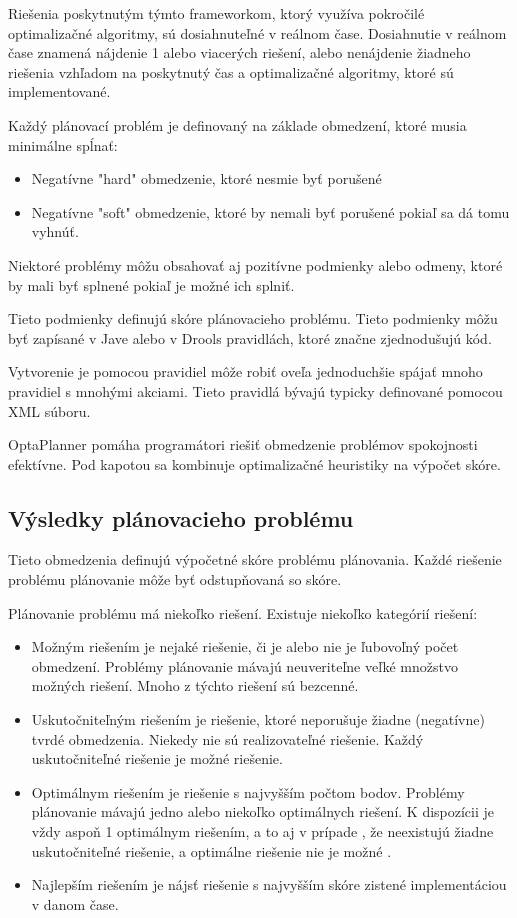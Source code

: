 Riešenia poskytnutým týmto frameworkom, ktorý využíva pokročilé optimalizačné algoritmy, sú dosiahnuteľné v reálnom čase. Dosiahnutie v reálnom čase znamená nájdenie 1 alebo viacerých riešení, alebo nenájdenie žiadneho riešenia vzhľadom na poskytnutý čas a optimalizačné algoritmy, ktoré sú implementované.

Každý plánovací problém je definovaný na základe obmedzení, ktoré musia minimálne spĺnať: \cite{optabook}
\begin{itemize}
\item Negatívne "hard" obmedzenie, ktoré nesmie byť porušené
\item Negatívne "soft" obmedzenie, ktoré by nemali byť porušené pokiaľ sa dá tomu vyhnúť.
\end{itemize}

Niektoré problémy môžu obsahovať aj pozitívne podmienky alebo odmeny, ktoré by mali byť splnené pokiaľ je možné ich splniť.

Tieto podmienky definujú skóre plánovacieho problému. Tieto podmienky môžu byť zapísané v Jave alebo v Drools pravidlách, ktoré značne zjednodušujú kód.

 Vytvorenie je pomocou pravidiel  môže robiť  oveľa jednoduchšie spájať mnoho pravidiel s mnohými akciami. Tieto pravidlá bývajú typicky definované pomocou XML súboru.

OptaPlanner pomáha  programátori riešiť obmedzenie problémov spokojnosti efektívne. Pod kapotou sa kombinuje optimalizačné heuristiky na výpočet skóre.



\subsection{Výsledky plánovacieho problému}

Tieto obmedzenia definujú výpočetné skóre problému plánovania. Každé riešenie problému plánovanie môže byť odstupňovaná so skóre. 

Plánovanie problému má niekoľko riešení. Existuje niekoľko kategórií riešení:
\begin{itemize}
\item Možným riešením je nejaké riešenie, či je alebo nie je ľubovoľný počet obmedzení. Problémy plánovanie mávajú neuveriteľne veľké množstvo možných riešení. Mnoho z týchto riešení sú bezcenné.
\item Uskutočniteľným riešením je riešenie, ktoré neporušuje žiadne (negatívne) tvrdé obmedzenia. Niekedy nie sú realizovateľné riešenie. Každý uskutočniteľné riešenie je možné riešenie.

\item Optimálnym riešením je riešenie s najvyšším počtom bodov. Problémy plánovanie mávajú jedno alebo niekoľko optimálnych riešení. K dispozícii je vždy aspoň 1 optimálnym riešením, a to aj v prípade , že neexistujú žiadne uskutočniteľné riešenie, a optimálne riešenie nie je možné .
\item Najlepším riešením je nájsť riešenie s najvyšším skóre zistené implementáciou v danom čase.

\end{itemize}

